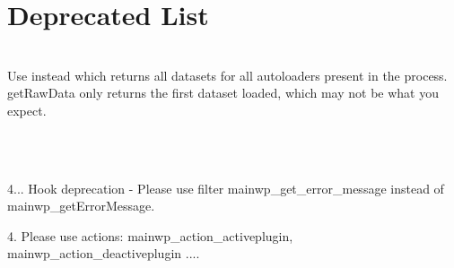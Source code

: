 \chapter{Deprecated List}
\hypertarget{deprecated}{}\label{deprecated}

\begin{DoxyRefList}
\item[Member \doxylink{class_composer_1_1_installed_versions_a1fd2f2e9169766a9a1e937bdaf4b0368}{Composer\textbackslash{}Installed\+Versions\+::get\+Raw\+Data} ()]\hfill \\
\label{deprecated__deprecated000009}%
%
Use  instead which returns all datasets for all autoloaders present in the process. get\+Raw\+Data only returns the first dataset loaded, which may not be what you expect.  
\item[Member \doxylink{class_main_w_p_1_1_dashboard_1_1_main_w_p___connect_a547ca35c5c6c1cbf62e0abc3de12b5f2}{Main\+WP\textbackslash{}Dashboard\textbackslash{}Main\+WP\+\_\+\+Connect\+::fetch\+\_\+urls\+\_\+authed} (\&\$websites, \$what, \$params, \$handler, \&\$output, \$what\+Page=null, \$others=array())]\hfill \\
\label{deprecated__deprecated000001}%
%
  
\item[Member \doxylink{class_main_w_p_1_1_dashboard_1_1_main_w_p___hooks_ad6e27a628728cca6263634cf27e9afbc}{Main\+WP\textbackslash{}Dashboard\textbackslash{}Main\+WP\+\_\+\+Hooks\+::\+\_\+\+\_\+construct} ()]\hfill \\
\label{deprecated__deprecated000002}%
%
4... Hook deprecation -\/ Please use filter {\ttfamily mainwp\+\_\+get\+\_\+error\+\_\+message} instead of {\ttfamily mainwp\+\_\+get\+Error\+Message}.

\label{deprecated__deprecated000003}%
%
4. Please use actions\+: mainwp\+\_\+action\+\_\+activeplugin, mainwp\+\_\+action\+\_\+deactiveplugin .... 


\end{DoxyRefList}
